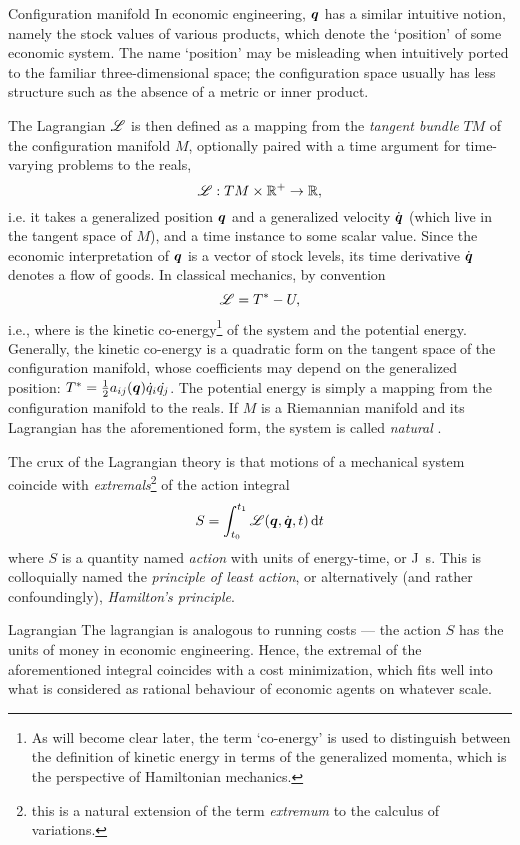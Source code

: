 \begin{econ}{Configuration manifold}
    In economic engineering, \(\vb*{q}\) has a similar intuitive notion, namely the stock values of various products, which denote the `position' of some economic system. The name `position' may be misleading when intuitively ported to the familiar three-dimensional space; the configuration space usually has less structure such as the absence of a metric or inner product.
\end{econ}

The Lagrangian \(\mathscr{L}\) is then defined as a mapping from the \emph{tangent bundle} \(TM\) of the configuration manifold \(M\), optionally paired with a time argument for time-varying problems to the reals,
    \[ \mathscr{L} : TM \times \mathbb{R}^+ \to \mathbb{R}, \]
    i.e. it takes a generalized position \(\vb*{q}\) and a generalized velocity \(\dot{\vb*{q}}\) (which live in the tangent space of \(M\)), and a time instance to some scalar value. Since the economic interpretation of \(\vb*{q}\) is a vector of stock levels, its time derivative \(\dot{\vb*{q}}\) denotes a flow of goods. In classical mechanics, by convention 
    \[\mathscr{L} = T^* - U,\] 
    i.e., where \ecokin is the kinetic co-energy\footnote{As will become clear later, the term `co-energy' is used to distinguish between the definition of kinetic energy in terms of the generalized momenta, which is the perspective of Hamiltonian mechanics.} of the system and \epot the potential energy. Generally, the kinetic co-energy is a quadratic form on the tangent space of the configuration manifold, whose coefficients may depend on the generalized position: \(T^* = \frac{1}{2}a_{ij}(\vb*{q})\dot{q}_i\dot{q_j} \). The potential energy is simply a mapping from the configuration manifold to the reals. If \(M\) is a Riemannian manifold and its Lagrangian has the aforementioned form, the system is called \emph{natural} \cite{Arnold1989}.

The crux of the Lagrangian theory is that motions of a mechanical system coincide with \emph{extremals}\footnote{this is a natural extension of the term \emph{extremum} to the calculus of variations.} of the action integral
\[ S = \int^{t_1}_{t_0} \mathscr{L}(\vb*{q}, \dot{\vb*{q}}, t) \dd{t}\]
where \(S\) is a quantity named \emph{action} with units of energy-time, or \si{\joule \second}. This is colloquially named the \emph{principle of least action}, or alternatively (and rather confoundingly), \emph{Hamilton's principle}.

\begin{econ}{Lagrangian}
   The lagrangian is analogous to running costs --- the action \(S\) has the units of money in economic engineering. Hence, the extremal of the aforementioned integral coincides with a cost minimization, which fits well into what is considered as rational behaviour of economic agents on whatever scale. 
\end{econ}

